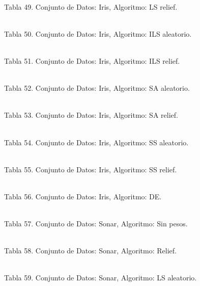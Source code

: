 \documentclass{ci5652}
\begin{document}
%
\\
Tabla 49. Conjunto de Datos: Iris, Algoritmo: LS relief.

%
\\
Tabla 50. Conjunto de Datos: Iris, Algoritmo: ILS aleatorio.

%
\\
Tabla 51. Conjunto de Datos: Iris, Algoritmo: ILS relief.

%
\\
Tabla 52. Conjunto de Datos: Iris, Algoritmo: SA aleatorio.

%
\\
Tabla 53. Conjunto de Datos: Iris, Algoritmo: SA relief.

%
\\
Tabla 54. Conjunto de Datos: Iris, Algoritmo: SS aleatorio.

%
\\
Tabla 55. Conjunto de Datos: Iris, Algoritmo: SS relief.

%
\\
Tabla 56. Conjunto de Datos: Iris, Algoritmo: DE.

%
\\
Tabla 57. Conjunto de Datos: Sonar, Algoritmo: Sin pesos.

%
\\
Tabla 58. Conjunto de Datos: Sonar, Algoritmo: Relief.

%
\\
Tabla 59. Conjunto de Datos: Sonar, Algoritmo: LS aleatorio.
\end{document}
